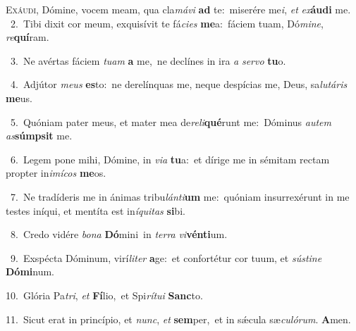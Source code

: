 \lettrine{\initial\textcolor{\initialcolor}{E}}{xáudi,} Dómine, vocem meam, qua cla\-\textit{má}\-\textit{vi} \textbf{ad} te:~\star miserére me\-\textit{i}\-, \textit{et} \textit{ex}\-\textbf{áu}\textbf{di} me.\\
{\numbfont\textcolor{\numbcolor}{~2.}}~Tibi dixit cor meum, exquisívit te fá\-\textit{ci}\-\textit{es} \textbf{me}\-a:~\star fáciem tuam, Dó\-\textit{mi}\-\textit{ne}, \textit{re}\-\textbf{quí}ram.\par
{\numbfont\textcolor{\numbcolor}{~3.}}~Ne avértas fáciem \textit{tu}\-\textit{am} \textbf{a} me,~\star ne declínes in ira \textit{a} \textit{ser}\-\textit{vo} \textbf{tu}\-o.\par
{\numbfont\textcolor{\numbcolor}{~4.}}~Adjútor \textit{me}\-\textit{us} \textbf{es}\-to:~\star ne derelínquas me, neque despícias me, Deus, sa\-\textit{lu}\-\textit{tá}\textit{ris} \textbf{me}\-us.\par
{\numbfont\textcolor{\numbcolor}{~5.}}~Quóniam pater meus, et mater mea de\-\textit{re}\-\textit{li}\textbf{qué}runt me:~\star Dóminus \textit{au}\-\textit{tem} \textit{as}\-\textbf{súmp}\textbf{sit} me.\par
{\numbfont\textcolor{\numbcolor}{~6.}}~Legem pone mihi, Dómine, in \textit{vi}\-\textit{a} \textbf{tu}\-a:~\star et dírige me in sémitam rectam propter in\-\textit{i}\-\textit{mí}\textit{cos} \textbf{me}\-os.\par
{\numbfont\textcolor{\numbcolor}{~7.}}~Ne tradíderis me in ánimas tribu\-\textit{lán}\-\textit{ti}\textbf{um} me:~\star quóniam insurrexérunt in me testes iníqui, et mentíta est in\-\textit{í}\-\textit{qui}\textit{tas} \textbf{si}\-bi.\par
{\numbfont\textcolor{\numbcolor}{~8.}}~Credo vidére \textit{bo}\-\textit{na} \textbf{Dó}\-mini~\star in \textit{ter}\-\textit{ra} \textit{vi}\-\textbf{vén}\textbf{ti}um.\par
{\numbfont\textcolor{\numbcolor}{~9.}}~Exspécta Dóminum, virí\-\textit{li}\-\textit{ter} \textbf{a}\-ge:~\star et confortétur cor tuum, et \textit{sús}\-\textit{ti}\textit{ne} \textbf{Dó}\-\textbf{mi}num.\par
{\numbfont\textcolor{\numbcolor}{10.}}~Glória Pa\-\textit{tri}\-, \textit{et} \textbf{Fí}\-lio,~\star et Spi\-\textit{rí}\-\textit{tu}\textit{i} \textbf{Sanc}\-to.\par
{\numbfont\textcolor{\numbcolor}{11.}}~Sicut erat in princípio, et \textit{nunc}\-, \textit{et} \textbf{sem}\-per,~\star et in sǽcula sæ\-\textit{cu}\-\textit{ló}\textit{rum}. \textbf{A}\-men.\par
